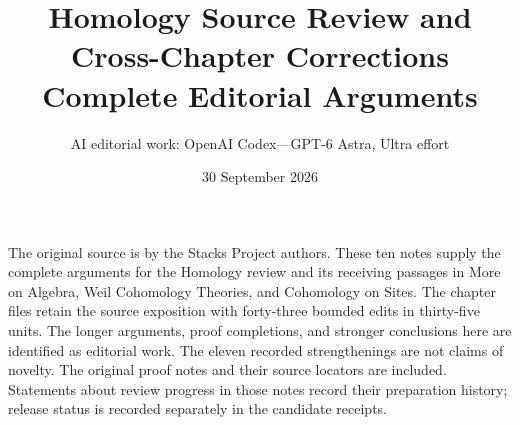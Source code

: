 \documentclass[11pt]{article}
\title{Homology Source Review and Cross-Chapter Corrections\\Complete Editorial Arguments}
\author{AI editorial work: OpenAI Codex---GPT-6 Astra, Ultra effort}
\date{30 September 2026}
\begin{document}
\maketitle
\noindent
The original source is by the Stacks Project authors. These ten notes
supply the complete arguments for the Homology review and its receiving
passages in More on Algebra, Weil Cohomology Theories, and Cohomology on
Sites. The chapter files retain the source exposition with forty-three
bounded edits in thirty-five units. The longer arguments, proof
completions, and stronger conclusions here are identified as editorial
work. The eleven recorded strengthenings are not claims of novelty.
The original proof notes and their source locators are included. Statements
about review progress in those notes record their preparation history;
release status is recorded separately in the candidate receipts.
\setcounter{secnumdepth}{1}
\tableofcontents\clearpage
\clearpage
\clearpage
\clearpage
\clearpage
\clearpage
\clearpage
\clearpage
\clearpage
\clearpage
\clearpage
\end{document}
